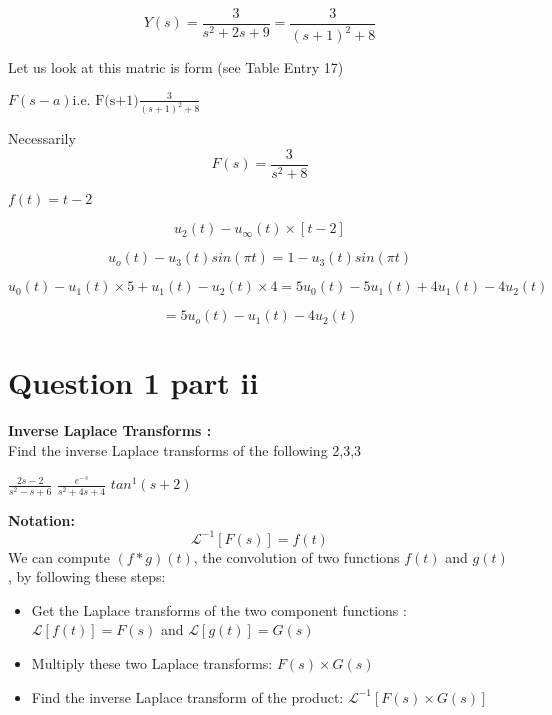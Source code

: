 \documentclass[11pt,a4paper,titlepage,oneside,openany]{article}
\numberwithin{equation}{section}
\numberwithin{algorithm}{section}
\numberwithin{figure}{section}
\numberwithin{table}{section}
\begin{document}
\[ Y(s) = \frac{3}{s^2+2s+9} = \frac{3}{(s+1)^2+8} \]

Let us look at this matric is form (see Table Entry 17)

$F(s-a) \mbox{i.e. F(s+1)} \frac{3}{(s+1)^2+8}$

Necessarily \[ F(s) = \frac{3}{s^2+8} \]


\newpage
\newpage
$f(t) = t-2$



\[u_2(t) -  u_{\infty}(t) \times [t-2]\]



\[u_o(t) -  u_3(t) sin(\pi t)=1 - u_3(t) sin (\pi t)\]


\[u_0(t) -  u_1(t)  \times 5 + u_1(t) -  u_2(t)  \times 4 = 5u_0(t) -  5u_1(t) + 4u_1(t) -  4u_2(t)\]

\[= 5u_o(t) -  u_1(t) - 4u_2(t)\]

\section*{Question 1 part ii}

\textbf{Inverse Laplace Transforms : } \\
Find the inverse Laplace transforms of the following 2,3,3

$\frac{2s-2}{s^2-s+6}$
$\frac{e^{-s}}{s^2 + 4s + 4}$
$ tan^1(s+2)$




\textbf{Notation:}
\[
\mathcal{L}^{-1} [F(s)] = f(t) \]
We can compute $ (f * g )(t)$, the convolution of two functions $f(t)$ and $g(t)$, by following these steps:\\
\bigskip
\begin{itemize}
\item Get the Laplace transforms of the two component functions : $\mathcal{L}[f(t)] = F(s)$ and $\mathcal{L}[g(t)] = G(s)$
\item Multiply these two Laplace transforms: $ F(s) \times G(s)$
\item Find the inverse Laplace transform of the product: $\mathcal{L}^{-1}[F(s) \times G(s)] $
\end{itemize}
\end{document}
